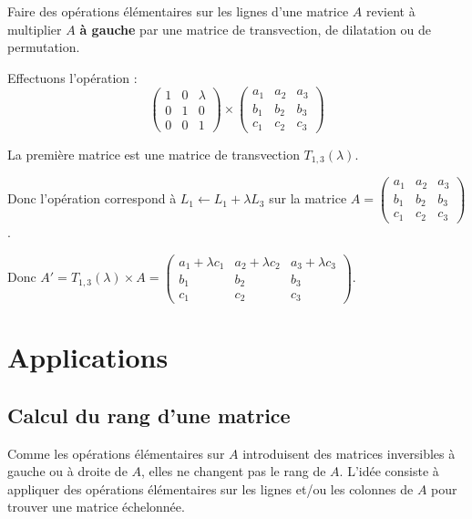 \documentclass[12pt, a4paper]{report}
\begin{document}
\begin{remark}
    Faire des opérations élémentaires sur les lignes d'une matrice $A$ revient à multiplier $A$ \textbf{à gauche} par une matrice de transvection, de dilatation ou de permutation.
\end{remark}

\begin{example}
    Effectuons l'opération :
    $$\left(\begin{matrix}
        1 & 0 & \lambda \\
        0 & 1 & 0 \\
        0 & 0 & 1
    \end{matrix}\right) \times \left(\begin{matrix}
        a_1 & a_2 & a_3 \\
        b_1 & b_2 & b_3 \\
        c_1 & c_2 & c_3
    \end{matrix}\right)$$

    La première matrice est une matrice de transvection $T_{1,3}(\lambda)$.

    Donc l'opération correspond à $L_1 \leftarrow L_1 + \lambda L_3$ sur la matrice $A = \left(\begin{matrix}
        a_1 & a_2 & a_3 \\
        b_1 & b_2 & b_3 \\
        c_1 & c_2 & c_3
    \end{matrix}\right)$.

    Donc $A' = T_{1,3}(\lambda) \times A = \left(\begin{matrix}
        a_1 + \lambda c_1 & a_2 + \lambda c_2 & a_3 + \lambda c_3 \\
        b_1 & b_2 & b_3 \\
        c_1 & c_2 & c_3
    \end{matrix}\right)$.
\end{example}

\section{Applications}

\subsection{Calcul du rang d'une matrice}

Comme les opérations élémentaires sur $A$ introduisent des matrices inversibles à gauche ou à droite de $A$, elles ne changent pas le rang de $A$. L'idée consiste à appliquer des opérations élémentaires sur les lignes et/ou les colonnes de $A$ pour trouver une matrice échelonnée.
\end{document}
